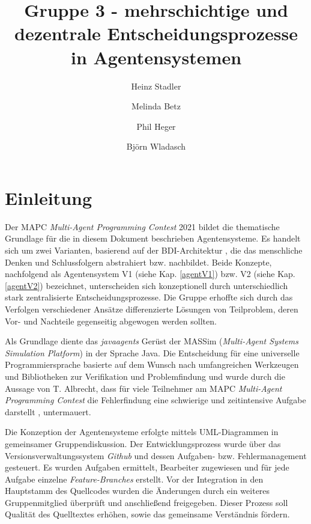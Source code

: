 \documentclass[runningheads]{llncs}
\begin{document}
%
\title{Gruppe 3 - mehrschichtige und dezentrale Entscheidungsprozesse in Agentensystemen }
%
%
\author{Heinz Stadler\and
Melinda Betz\and
Phil Heger\and
Björn Wladasch}
%
%
%
\maketitle              %
%
%
\section{Einleitung}
Der MAPC \textit{Multi-Agent Programming Contest} 2021\cite{MAPC2021} bildet die thematische Grundlage für die in diesem Dokument beschrieben Agentensysteme. Es handelt sich um zwei Varianten, basierend auf der BDI-Architektur \cite{Bratman1987}, die das menschliche Denken und Schlussfolgern abstrahiert bzw. nachbildet. Beide Konzepte, nachfolgend als Agentensystem V1 (siehe Kap. \ref{agentV1}) bzw. V2 (siehe Kap. \ref{agentV2}) bezeichnet, unterscheiden sich konzeptionell durch unterschiedlich stark zentralisierte Entscheidungsprozesse.
Die Gruppe erhoffte sich durch das Verfolgen verschiedener Ansätze differenzierte Lösungen von Teilproblem, deren Vor- und Nachteile gegenseitig abgewogen werden sollten.


Als Grundlage diente das \textit{javaagents} Gerüst der MASSim (\textit{Multi-Agent Systems Simulation Platform}) \cite{EISMASSim} in der Sprache Java. Die Entscheidung für eine universelle Programmiersprache basierte auf dem Wunsch nach umfangreichen Werkzeugen und Bibliotheken zur Verifikation und Problemfindung und wurde durch die Aussage von T. Albrecht, dass für viele Teilnehmer am MAPC \textit{Multi-Agent Programming Contest} die Fehlerfindung eine schwierige und zeitintensive Aufgabe darstellt \cite[S. 17]{Ahlbrecht2021}, untermauert.

Die Konzeption der Agentensysteme erfolgte mittels UML-Diagrammen in gemeinsamer Gruppendiskussion.
Der Entwicklungsprozess wurde über das Versionsverwaltungssystem \textit{Github} und dessen Aufgaben- bzw. Fehlermanagement gesteuert. Es wurden Aufgaben ermittelt, Bearbeiter zugewiesen und für jede Aufgabe einzelne \textit{Feature-Branches} erstellt. Vor der Integration in den Hauptstamm des Quellcodes wurden die Änderungen durch ein weiteres Gruppenmitglied überprüft und anschließend freigegeben. Dieser Prozess soll Qualität des Quelltextes erhöhen, sowie das gemeinsame Verständnis fördern.
\end{document}
